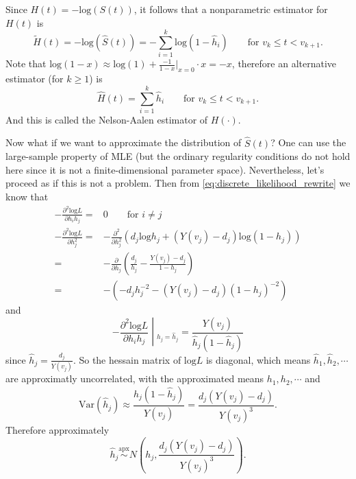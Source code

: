\documentclass[a4paper,12pt]{article}
\begin{document}
\par

Since $H\left(t\right) = -\mathrm{log}\left(S\left(t\right)\right)$, it follows that a nonparametric estimator for $H\left(t\right)$ is
\[
  \tilde{H}\left(t\right) = -\mathrm{log}\left(\hat{S}\left(t\right)\right) =
  -\sum\limits_{i = 1}^k\mathrm{log}\left(1 - \hat{h}_i\right)
  \quad\quad\text{for } v_k\leq t < v_{k + 1}
  .
\]
Note that $\mathrm{log}\left(1 - x\right) \approx \mathrm{log}\left(1\right) + \frac{-1}{1 - x}|_{x = 0}\cdot x = -x$, therefore an alternative estimator (for $k\geq 1$) is
\[
  \hat{H}\left(t\right) = \sum\limits_{i = 1}^k\hat{h}_i
  \quad\quad\text{for } v_k\leq t < v_{k + 1}
  .  
\]
And this is called the {\color{red}Nelson-Aalen} estimator of $H\left(\cdot\right)$.
\par
Now what if we want to approximate the distribution of $\hat{S}\left(t\right)$? One can use the large-sample property of MLE (but the ordinary regularity conditions do not hold here since it is not a finite-dimensional parameter space). Nevertheless, let's proceed as if this is not a problem. Then from \eqref{eq:discrete_likelihood_rewrite} we know that
\[
  \begin{aligned}
    -\frac{\partial^2\mathrm{log}L}{\partial h_ih_j}
    =& 0
       \quad\quad\text{for } i\neq j    \\
    -\frac{\partial^2\mathrm{log}L}{\partial h_j^2}
    =& - \frac{\partial^2}{\partial h_j^2}\left(
       d_j\mathrm{log}h_j + \left(Y\left(v_j\right) - d_j\right)\mathrm{log}\left(1 - h_j\right)
       \right)    \\
    =& - \frac{\partial}{\partial h_j}\left(
       \frac{d_j}{h_j} - \frac{Y\left(v_j\right) - d_j}{1 - h_j}
       \right)    \\
    =& - \left(
       -d_j h_j^{-2}
       - \left(Y\left(v_j\right) - d_j\right)\left(1 - h_j\right)^{-2}
       \right)
  \end{aligned}
\]
and
\[
  \left.
    -\frac{\partial^2\mathrm{log}L}{\partial h_ih_j}
    \middle|_{h_j = \hat{h}_j}
  \right.
  = \frac{Y\left(v_j\right)}{\hat{h}_j\left(1 - \hat{h}_j\right)}
\]
since $\hat{h}_j = \frac{d_j}{Y\left(v_j\right)}$. So the hessain matrix of $\mathrm{log}L$ is diagonal, which means $\hat{h}_1, \hat{h}_2, \cdots$ are approximatly uncorrelated, with the approximated means $h_1, h_2, \cdots$ and
\[
  \mathrm{Var}\left(\hat{h}_j\right)
  \approx
  \frac{\hat{h}_j\left(1 - \hat{h}_j\right)}{Y\left(v_j\right)}
  = \frac{d_j\left(Y\left(v_j\right) - d_j\right)}{Y\left(v_j\right)^3}
  .
\]
Therefore approximately
\[
  \hat{h}_j \overset{\text{apx}}{\sim} N\left(h_j, \frac{d_j\left(Y\left(v_j\right) - d_j\right)}{Y\left(v_j\right)^3}\right)
  .
\]
\end{document}
